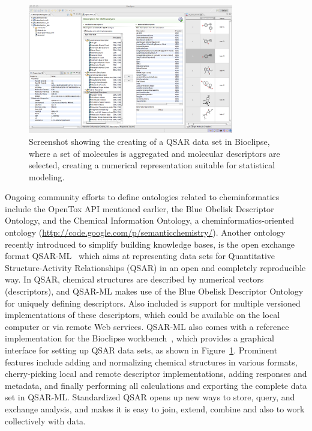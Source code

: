 \documentclass[11pt]{book}
\begin{document}
\begin{figure}[bt]
\begin{center}
\includegraphics[width=0.8\textwidth]{graphics/qsar-collab.png}
\end{center}
\caption{Screenshot showing the creating of a QSAR data set in Bioclipse,
where a set of molecules is aggregated and molecular descriptors are
selected, creating a numerical representation suitable for statistical
modeling.}
\label{fig:qsarml}
\end{figure}

Ongoing community efforts to define ontologies related to cheminformatics include
the OpenTox API mentioned earlier, the Blue Obelisk Descriptor Ontology, and the
Chemical Information Ontology, a cheminformatics-oriented ontology
(\url{http://code.google.com/p/semanticchemistry/}). Another ontology
recently introduced to simplify building knowledge bases, is
the open exchange format QSAR-ML~\cite{Spjuth:2010fk} which aims at representing data sets
for Quantitative Structure-Activity Relationships (QSAR) in an open and completely
reproducible way. In QSAR, chemical structures are described by numerical vectors
(descriptors), and QSAR-ML makes use of the Blue Obelisk Descriptor Ontology for
uniquely defining descriptors. Also included is support for multiple versioned
implementations of these descriptors, which could be available on the local computer
or via remote Web services. QSAR-ML also comes with a reference implementation for
the Bioclipse workbench~\cite{Spjuth2009,Spjuth2007}, which provides a graphical
interface for setting up QSAR data sets, as shown in Figure~\ref{fig:qsarml}.
Prominent features include adding and
normalizing chemical structures in various formats, cherry-picking local and
remote descriptor implementations, adding responses and metadata, and finally
performing all calculations and exporting the complete data set in QSAR-ML.
Standardized QSAR opens up new ways to store, query, and exchange analysis,
and makes it is easy to join, extend, combine and also to work collectively with data.
\end{document}
